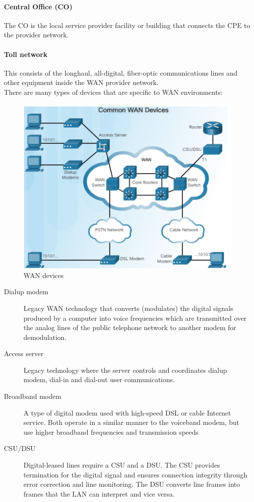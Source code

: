 \paragraph{Central Office (CO)} The CO is the local
service provider facility or building that
connects the CPE to the provider network.
\paragraph{Toll network} This consists of the longhaul, all-digital, fiber-optic communications lines and other equipment inside the WAN provider network.\\

There are many types of devices that are specific to WAN environments:

\begin{figure}[hbtp]
\caption{WAN devices}
\centering
\includegraphics[scale=1]{pictures/Device.PNG}
\end{figure}

\begin{description}
\item[Dialup modem] Legacy WAN technology that converts (modulates) the digital signals produced by a computer into voice frequencies which are transmitted over the analog lines of the public telephone network to another modem for demodulation.
\item[Access server] Legacy technology where the server controls and coordinates dialup modem, dial-in and dial-out user communications.
\item[Broadband modem] A type of digital modem used with high-speed DSL or cable Internet service. Both operate in a similar manner to the voiceband modem, but use higher broadband frequencies and transmission speeds
\item[CSU/DSU] Digital-leased lines require a CSU and a DSU. The CSU provides termination for the digital signal and ensures connection integrity through error correction and line monitoring. The DSU converts line frames into frames that the LAN can interpret and vice versa. 
\end{description}

